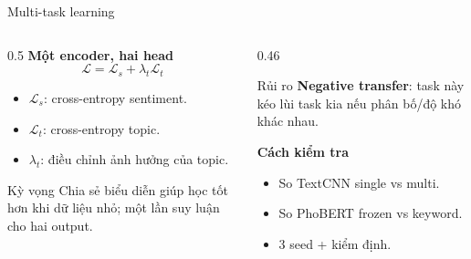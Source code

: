 \documentclass[aspectratio=169,11pt]{beamer}
\begin{document}
\begin{frame}{Multi-task learning}
\begin{columns}[T]
\begin{column}{0.5\textwidth}
\textbf{Một encoder, hai head}
\[
\mathcal{L} = \mathcal{L}_s + \lambda_t \mathcal{L}_t
\]
\begin{itemize}
  \item $\mathcal{L}_s$: cross-entropy sentiment.
  \item $\mathcal{L}_t$: cross-entropy topic.
  \item $\lambda_t$: điều chỉnh ảnh hưởng của topic.
\end{itemize}

\vspace{0.2cm}
\begin{block}{Kỳ vọng}
Chia sẻ biểu diễn giúp học tốt hơn khi dữ liệu nhỏ; một lần suy luận cho hai output.
\end{block}
\end{column}
\begin{column}{0.46\textwidth}
\begin{block}{Rủi ro}
\textbf{Negative transfer}: task này kéo lùi task kia nếu phân bố/độ khó khác nhau.
\end{block}

\vspace{0.2cm}
\textbf{Cách kiểm tra}
\begin{itemize}
  \item So TextCNN single vs multi.
  \item So PhoBERT frozen vs keyword.
  \item 3 seed + kiểm định.
\end{itemize}
\end{column}
\end{columns}
\end{frame}
\end{document}
